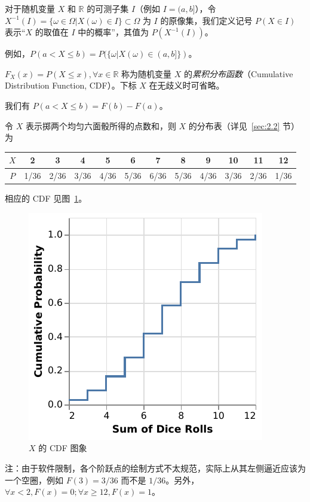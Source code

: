 \documentclass[../main.tex]{subfiles}
\begin{document}
\begin{definition}\label{def:2.1.2}
对于随机变量 $X$ 和 $\mathbb{R}$ 的可测子集 $I$（例如 $I=(a,b]$），令 $X^{-1}(I)=\{\omega\in\Omega|X(\omega)\in I\}\subset\Omega$ 为 $I$ 的原像集，我们定义记号 $P(X\in I)$ 表示“$X$ 的取值在 $I$ 中的概率”，其值为 $P(X^{-1}(I))$。
\end{definition}

例如，$P(a<X\leq b)=P(\{\omega|X(\omega)\in(a,b]\})$。

\begin{definition}\label{def:2.1.3}
$F_X(x)=P(X\leq x),\forall x\in\mathbb{R}$ 称为随机变量 $X$ 的\emph{累积分布函数}（Cumulative Distribution Function, CDF）。下标 $X$ 在无歧义时可省略。
\end{definition}

我们有 $P(a<X\leq b)=F(b)-F(a)$。

\begin{example}
令 $X$ 表示掷两个均匀六面骰所得的点数和，则 $X$ 的分布表（详见~\ref{sec:2.2} 节）为

\bigskip
\begin{tabular}{|c|c|c|c|c|c|c|c|c|c|c|c|}
\hline
$X$ & 2 & 3 & 4 & 5 & 6 & 7 & 8 & 9 & 10 & 11 & 12 \\
\hline
$P$ & 1/36 & 2/36 & 3/36 & 4/36 & 5/36 & 6/36 & 5/36 & 4/36 & 3/36 & 2/36 & 1/36 \\
\hline
\end{tabular}
\bigskip

相应的 CDF 见图~\ref{fig:2.1.1}。

\begin{figure}[!h]
  \centering
  \includegraphics{figures/sum_2_dice_cdf.pdf}
  \caption{$X$ 的 CDF 图象}
  \label{fig:2.1.1}
\end{figure}

注：由于软件限制，各个阶跃点的绘制方式不太规范，实际上从其左侧逼近应该为一个空圈，例如 $F(3)=3/36$ 而不是 $1/36$。另外，$\forall x<2,F(x)=0;\forall x\geq 12,F(x)=1$。
\end{example}
\end{document}
